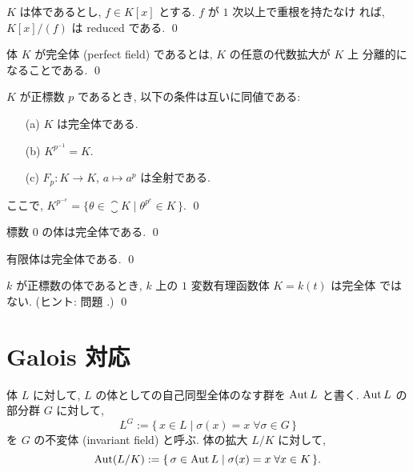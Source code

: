 \documentclass[12pt,twoside]{jarticle}
\begin{document}
\begin{question}
  $K$ は体であるとし, $f\in K[x]$ とする.  $f$ が $1$ 次以上で重根を持たなけ
  れば, $K[x]/(f)$ は reduced である.  \qed
\end{question}

\begin{definition}
  体 $K$ が完全体 (perfect field) であるとは, $K$ の任意の代数拡大が $K$ 上
  分離的になることである. \qed
\end{definition}

\begin{question}
  $K$ が正標数 $p$ であるとき, 以下の条件は互いに同値である:
  \begin{itemize}
  \item[(a)] $K$ は完全体である.
  \item[(b)] $K^{p^{-1}} = K$.
  \item[(c)] $F_p:K\to K$, $a\mapsto a^p$ は全射である.
  \end{itemize}
  ここで, $K^{p^{-e}}=\{\theta\in\closure{K}\mid\theta^{p^e}\in K\,\}$.
  \qed
\end{question}

\begin{question}
  標数 $0$ の体は完全体である. \qed
\end{question}

\begin{question}
  有限体は完全体である. \qed
\end{question}

\begin{question}
  $k$ が正標数の体であるとき, $k$ 上の $1$ 変数有理函数体 $K=k(t)$ は完全体
  ではない.  (ヒント: 問題 .) \qed
\end{question}


\section{Galois 対応}

体 $L$ に対して, $L$ の体としての自己同型全体のなす群を $\mathop{\mathrm{Aut}}\nolimits L$ と書く.
$\mathop{\mathrm{Aut}}\nolimits L$ の部分群 $G$ に対して,
\begin{equation*}
  L^G := \{\, x\in L \mid \sigma(x) = x \; \forall\sigma\in G\,\}
\end{equation*}
を $G$ の不変体 (invariant field) と呼ぶ. 体の拡大 $L/K$ に対して,
\begin{equation*}
  \mathop{\mathrm{Aut}}\nolimits(L/K) := \{\,\sigma\in\mathop{\mathrm{Aut}}\nolimits L\mid \sigma(x)=x\;\forall x\in K\,\}.
\end{equation*}
\end{document}
